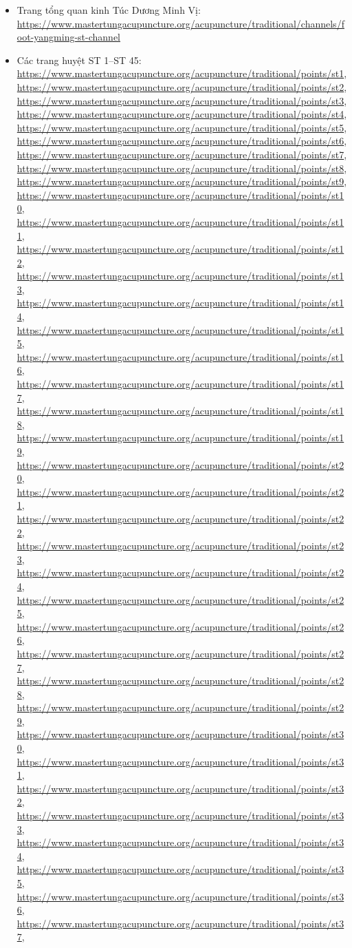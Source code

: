 \documentclass[12pt,a4paper]{article}
\begin{document}
\begin{itemize}
  \item Trang tổng quan kinh Túc Dương Minh Vị: \url{https://www.mastertungacupuncture.org/acupuncture/traditional/channels/foot-yangming-st-channel}
  \item Các trang huyệt ST 1--ST 45: \url{https://www.mastertungacupuncture.org/acupuncture/traditional/points/st1}, \url{https://www.mastertungacupuncture.org/acupuncture/traditional/points/st2}, \url{https://www.mastertungacupuncture.org/acupuncture/traditional/points/st3}, \url{https://www.mastertungacupuncture.org/acupuncture/traditional/points/st4}, \url{https://www.mastertungacupuncture.org/acupuncture/traditional/points/st5}, \url{https://www.mastertungacupuncture.org/acupuncture/traditional/points/st6}, \url{https://www.mastertungacupuncture.org/acupuncture/traditional/points/st7}, \url{https://www.mastertungacupuncture.org/acupuncture/traditional/points/st8}, \url{https://www.mastertungacupuncture.org/acupuncture/traditional/points/st9}, \url{https://www.mastertungacupuncture.org/acupuncture/traditional/points/st10}, \url{https://www.mastertungacupuncture.org/acupuncture/traditional/points/st11}, \url{https://www.mastertungacupuncture.org/acupuncture/traditional/points/st12}, \url{https://www.mastertungacupuncture.org/acupuncture/traditional/points/st13}, \url{https://www.mastertungacupuncture.org/acupuncture/traditional/points/st14}, \url{https://www.mastertungacupuncture.org/acupuncture/traditional/points/st15}, \url{https://www.mastertungacupuncture.org/acupuncture/traditional/points/st16}, \url{https://www.mastertungacupuncture.org/acupuncture/traditional/points/st17}, \url{https://www.mastertungacupuncture.org/acupuncture/traditional/points/st18}, \url{https://www.mastertungacupuncture.org/acupuncture/traditional/points/st19}, \url{https://www.mastertungacupuncture.org/acupuncture/traditional/points/st20}, \url{https://www.mastertungacupuncture.org/acupuncture/traditional/points/st21}, \url{https://www.mastertungacupuncture.org/acupuncture/traditional/points/st22}, \url{https://www.mastertungacupuncture.org/acupuncture/traditional/points/st23}, \url{https://www.mastertungacupuncture.org/acupuncture/traditional/points/st24}, \url{https://www.mastertungacupuncture.org/acupuncture/traditional/points/st25}, \url{https://www.mastertungacupuncture.org/acupuncture/traditional/points/st26}, \url{https://www.mastertungacupuncture.org/acupuncture/traditional/points/st27}, \url{https://www.mastertungacupuncture.org/acupuncture/traditional/points/st28}, \url{https://www.mastertungacupuncture.org/acupuncture/traditional/points/st29}, \url{https://www.mastertungacupuncture.org/acupuncture/traditional/points/st30}, \url{https://www.mastertungacupuncture.org/acupuncture/traditional/points/st31}, \url{https://www.mastertungacupuncture.org/acupuncture/traditional/points/st32}, \url{https://www.mastertungacupuncture.org/acupuncture/traditional/points/st33}, \url{https://www.mastertungacupuncture.org/acupuncture/traditional/points/st34}, \url{https://www.mastertungacupuncture.org/acupuncture/traditional/points/st35}, \url{https://www.mastertungacupuncture.org/acupuncture/traditional/points/st36}, \url{https://www.mastertungacupuncture.org/acupuncture/traditional/points/st37}, 
\end{itemize}
\end{document}
